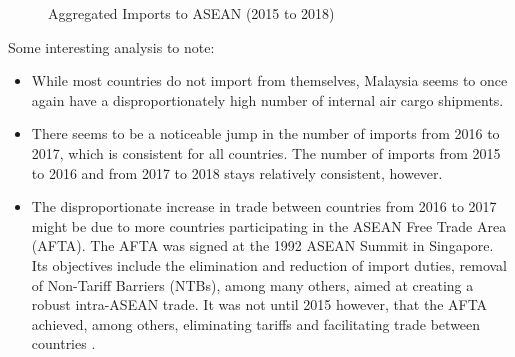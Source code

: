 \documentclass{article}
\begin{document}
\begin{subfigures}
\begin{figure}[H]
    \qquad
    \qquad
    \caption{Aggregated Imports to ASEAN (2015 to 2018)}
\end{figure}
\end{subfigures}

\newpage

\noindent Some interesting analysis to note: \\

\begin{itemize}
    \item While most countries do not import from themselves, Malaysia seems to once again have a disproportionately high number of internal air cargo shipments. 
    \item There seems to be a noticeable jump in the number of imports from 2016 to 2017, which is consistent for all countries. The number of imports from 2015 to 2016 and from 2017 to 2018 stays relatively consistent, however.
    \item The disproportionate increase in trade between countries from 2016 to 2017 might be due to more countries participating in the ASEAN Free Trade Area (AFTA). The AFTA was signed at the 1992 ASEAN Summit in Singapore. Its objectives include the elimination and reduction of import duties, removal of Non-Tariff Barriers (NTBs), among many others, aimed at creating a robust intra-ASEAN trade. It was not until 2015 however, that the AFTA achieved, among others, eliminating tariffs and facilitating trade between countries \cite{asean2}.
\end{itemize}
\end{document}
